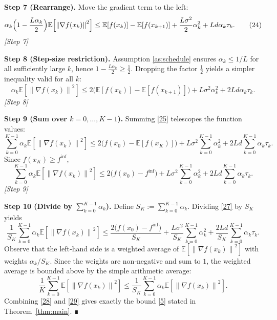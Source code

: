 \documentclass{article}
\newcommand{\E}{\mathbb{E}}
\newcommand{\norm}[1]{\left\|#1\right\|}
\begin{document}
\noindent\textbf{Step 7 (Rearrange).}  
Move the gradient term to the left:
\[
\alpha_{k}\Bigl(1-\frac{L\alpha_{k}}{2}\Bigr)\E\!\left[\norm{\nabla f(x_{k})}^{2}\right]
\le \E[f(x_{k})]-\E[f(x_{k+1})] +\frac{L\sigma^{2}}{2}\alpha_{k}^{2}+L d\alpha_{k}\tau_{k}.
\tag{24}
\]
\textit{[Step 7]}

\noindent\textbf{Step 8 (Step‑size restriction).}  
Assumption \ref{as:schedule} ensures $\alpha_{k}\le 1/L$ for all sufficiently large $k$, hence $1-\tfrac{L\alpha_{k}}{2}\ge\tfrac12$. Dropping the factor $\tfrac12$ yields a simpler inequality valid for all $k$:
\[
\alpha_{k}\E\!\left[\norm{\nabla f(x_{k})}^{2}\right]
\le 2\bigl(\E[f(x_{k})]-\E[f(x_{k+1})]\bigr)
+L\sigma^{2}\alpha_{k}^{2}+2L d\alpha_{k}\tau_{k}.
\tag{25}
\]
\textit{[Step 8]}

\noindent\textbf{Step 9 (Sum over $k=0,\dots,K-1$).}  
Summing \eqref{25} telescopes the function values:
\[
\sum_{k=0}^{K-1}\alpha_{k}\E\!\left[\norm{\nabla f(x_{k})}^{2}\right]
\le 2\bigl(f(x_{0})- \E[f(x_{K})]\bigr)
+L\sigma^{2}\sum_{k=0}^{K-1}\alpha_{k}^{2}
+2L d\sum_{k=0}^{K-1}\alpha_{k}\tau_{k}.
\tag{26}
\]
Since $f(x_{K})\ge f^{\inf}$,
\[
\sum_{k=0}^{K-1}\alpha_{k}\E\!\left[\norm{\nabla f(x_{k})}^{2}\right]
\le 2\bigl(f(x_{0})-f^{\inf}\bigr)
+L\sigma^{2}\sum_{k=0}^{K-1}\alpha_{k}^{2}
+2L d\sum_{k=0}^{K-1}\alpha_{k}\tau_{k}.
\tag{27}
\]
\textit{[Step 9]}

\noindent\textbf{Step 10 (Divide by $\sum_{k=0}^{K-1}\alpha_{k}$).}  
Define $S_{K}:=\sum_{k=0}^{K-1}\alpha_{k}$. Dividing \eqref{27} by $S_{K}$ yields
\[
\frac{1}{S_{K}}\sum_{k=0}^{K-1}\alpha_{k}\E\!\left[\norm{\nabla f(x_{k})}^{2}\right]
\le \frac{2\bigl(f(x_{0})-f^{\inf}\bigr)}{S_{K}}
+\frac{L\sigma^{2}}{S_{K}}\sum_{k=0}^{K-1}\alpha_{k}^{2}
+\frac{2L d}{S_{K}}\sum_{k=0}^{K-1}\alpha_{k}\tau_{k}.
\tag{28}
\]
Observe that the left‑hand side is a weighted average of $\E\!\left[\norm{\nabla f(x_{k})}^{2}\right]$ with weights $\alpha_{k}/S_{K}$. Since the weights are non‑negative and sum to $1$, the weighted average is bounded above by the simple arithmetic average:
\[
\frac{1}{K}\sum_{k=0}^{K-1}\E\!\left[\norm{\nabla f(x_{k})}^{2}\right]
\le \frac{1}{S_{K}}\sum_{k=0}^{K-1}\alpha_{k}\E\!\left[\norm{\nabla f(x_{k})}^{2}\right].
\tag{29}
\]
Combining \eqref{28} and \eqref{29} gives exactly the bound \eqref{5} stated in Theorem~\ref{thm:main}. ∎
\end{document}
